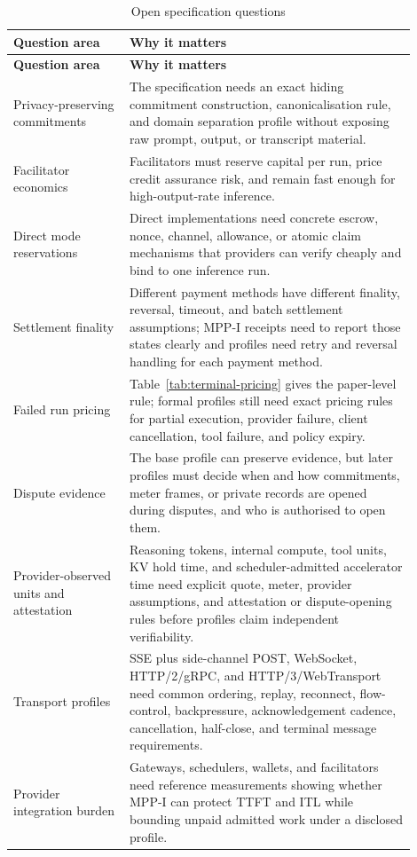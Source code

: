 \documentclass[11pt]{article}
\newcommand{\mppi}{MPP-I}
\begin{document}
\begin{longtable}{>{\raggedright\arraybackslash}p{0.26\linewidth} >{\raggedright\arraybackslash}p{0.64\linewidth}}
\caption{Open specification questions}\label{tab:open-questions}\\
\toprule
\textbf{Question area} & \textbf{Why it matters} \\
\midrule
\endfirsthead
\toprule
\textbf{Question area} & \textbf{Why it matters} \\
\midrule
\endhead
Privacy-preserving commitments & The specification needs an exact hiding commitment construction, canonicalisation rule, and domain separation profile without exposing raw prompt, output, or transcript material. \\
Facilitator economics & Facilitators must reserve capital per run, price credit assurance risk, and remain fast enough for high-output-rate inference. \\
Direct mode reservations & Direct implementations need concrete escrow, nonce, channel, allowance, or atomic claim mechanisms that providers can verify cheaply and bind to one inference run. \\
Settlement finality & Different payment methods have different finality, reversal, timeout, and batch settlement assumptions; \mppi{} receipts need to report those states clearly and profiles need retry and reversal handling for each payment method. \\
Failed run pricing & Table~\ref{tab:terminal-pricing} gives the paper-level rule; formal profiles still need exact pricing rules for partial execution, provider failure, client cancellation, tool failure, and policy expiry. \\
Dispute evidence & The base profile can preserve evidence, but later profiles must decide when and how commitments, meter frames, or private records are opened during disputes, and who is authorised to open them. \\
Provider-observed units and attestation & Reasoning tokens, internal compute, tool units, KV hold time, and scheduler-admitted accelerator time need explicit quote, meter, provider assumptions, and attestation or dispute-opening rules before profiles claim independent verifiability. \\
Transport profiles & SSE plus side-channel POST, WebSocket, HTTP/2/gRPC, and HTTP/3/WebTransport need common ordering, replay, reconnect, flow-control, backpressure, acknowledgement cadence, cancellation, half-close, and terminal message requirements. \\
Provider integration burden & Gateways, schedulers, wallets, and facilitators need reference measurements showing whether \mppi{} can protect TTFT and ITL while bounding unpaid admitted work under a disclosed profile. \\
\bottomrule
\end{longtable}
\end{document}

